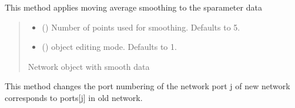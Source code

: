 \documentclass[letterpaper,10pt,english]{sphinxmanual}
\begin{document}
\begin{fulllineitems}
\begin{fulllineitems}
\label{\detokenize{touchstone:touchstone.spfile.smoothing}}
\pysigstartsignatures
{}
\pysigstopsignatures
\sphinxAtStartPar
This method applies moving average smoothing to the s\sphinxhyphen{}parameter data
\begin{quote}\begin{description}
\begin{itemize}
\item {}
\sphinxAtStartPar
{} (\sphinxstyleliteralemphasis{\sphinxupquote{, }}) \textendash{} Number of points used for smoothing. Defaults to 5.

\item {}
\sphinxAtStartPar
{} (\sphinxstyleliteralemphasis{\sphinxupquote{, }}) \textendash{} object editing mode. Defaults to \sphinxhyphen{}1.

\end{itemize}

\sphinxAtStartPar
Network object with smooth data

\sphinxAtStartPar
{\hyperref[\detokenize{touchstone:touchstone.spfile}]{}}

\end{description}\end{quote}

\end{fulllineitems}


\begin{fulllineitems}
\label{\detokenize{touchstone:touchstone.spfile.snp2smp}}
\pysigstartsignatures
{}
\pysigstopsignatures
\sphinxAtStartPar
This method changes the port numbering of the network
port j of new network corresponds to ports{[}j{]} in old network.


\end{fulllineitems}
\end{fulllineitems}
\end{document}
